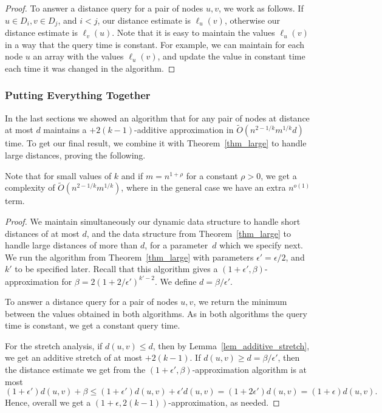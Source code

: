 \documentclass[11pt]{article}
\theoremstyle{definition}
\theoremstyle{remark}
\begin{document}
\begin{titlepage}
\begin{proof}
To answer a distance query for a pair of nodes $u,v$, we work as follows. If $u \in D_i, v \in D_j$, and $i<j$, our distance estimate is $\ell_u(v)$, otherwise our distance estimate is $\ell_v(u)$. Note that it is easy to maintain the values $\ell_u(v)$ in a way that the query time is constant. For example, we can maintain for each node $u$ an array with the values $\ell_u(v)$, and update the value in constant time each time it was changed in the algorithm.
\end{proof}



\subsubsection{Putting Everything Together} \label{sec_summary_additive}

In the last sections we showed an algorithm that for any pair of nodes at distance at most $d$ maintains a $+2(k-1)$-additive approximation in $\tilde{O}(n^{2-1/k}m^{1/k}d)$ time. To get our final result, we combine it with Theorem~\ref{thm_large} to handle large distances, proving the following.

\thmadd*


Note that for small values of $k$ and if $m=n^{1+\rho}$ for a constant $\rho>0$, we get a complexity of $\tilde{O}(n^{2-1/k}m^{1/k})$, where in the general case we have an extra $n^{o(1)}$ term.

\begin{proof}
We maintain simultaneously our dynamic data structure to handle short distances of at most $d$, and the data structure from Theorem~\ref{thm_large} to handle large distances of more than $d$, for a parameter~$d$ which we specify next. We run the algorithm from Theorem~\ref{thm_large} with parameters $\epsilon' = \epsilon/2$, and $k'$ to be specified later. Recall that this algorithm gives a $(1+\epsilon', \beta)$-approximation for $\beta= 2(1+2/\epsilon')^{k'-2}$. We define $d=\beta/\epsilon'$.

To answer a distance query for a pair of nodes $u,v$, we return the minimum between the values obtained in both algorithms. As in both algorithms the query time is constant, we get a constant query time. 

For the stretch analysis, if $d(u,v) \leq d$, then by Lemma~\ref{lem_additive_stretch}, we get an additive stretch of at most $+2(k-1)$. If $d(u,v) \geq d = \beta/\epsilon'$, then the distance estimate we get from the $(1+\epsilon',\beta)$-approximation algorithm is at most $$(1+\epsilon')d(u,v) + \beta \leq (1+\epsilon')d(u,v) + \epsilon' d(u,v) = (1+2\epsilon')d(u,v)=(1+\epsilon)d(u,v).$$
Hence, overall we get a $(1+\epsilon,2(k-1))$-approximation, as needed.


\end{proof}
\end{titlepage}
\end{document}
